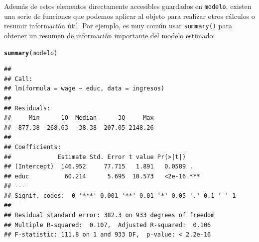 \documentclass[12pt]{report}\usepackage[]{graphicx}\usepackage[]{color}
\makeatletter
\newcommand{\hlstd}[1]{\textcolor[rgb]{0.345,0.345,0.345}{#1}}%
\newcommand{\hlkwd}[1]{\textcolor[rgb]{0.737,0.353,0.396}{\textbf{#1}}}%
\newenvironment{kframe}{%
 \def\at@end@of@kframe{}%
 \ifinner\ifhmode%
  \def\at@end@of@kframe{\end{minipage}}%
  \begin{minipage}{\columnwidth}%
 \fi\fi%
 \def\FrameCommand##1{\hskip\@totalleftmargin \hskip-\fboxsep
 \colorbox{shadecolor}{##1}\hskip-\fboxsep
     \hskip-\linewidth \hskip-\@totalleftmargin \hskip\columnwidth}%
 \MakeFramed {\advance\hsize-\width
   \@totalleftmargin\z@ \linewidth\hsize
   \@setminipage}}%
 {\par\unskip\endMakeFramed%
 \at@end@of@kframe}
\newenvironment{knitrout}{}{} %
\makeatother
\begin{document}
Además de estos elementos directamente accesibles guardados en \verb|modelo|, existen una serie de funciones que podemos aplicar al objeto para realizar otros cálculos o resumir información útil. Por ejemplo, es muy común usar \verb|summary()| para obtener un resumen de información importante del modelo estimado:
\begin{knitrout}
\color{fgcolor}\begin{kframe}
\begin{alltt}
\hlkwd{summary}\hlstd{(modelo)}
\end{alltt}
\begin{verbatim}
## 
## Call:
## lm(formula = wage ~ educ, data = ingresos)
## 
## Residuals:
##     Min      1Q  Median      3Q     Max 
## -877.38 -268.63  -38.38  207.05 2148.26 
## 
## Coefficients:
##             Estimate Std. Error t value Pr(>|t|)    
## (Intercept)  146.952     77.715   1.891   0.0589 .  
## educ          60.214      5.695  10.573   <2e-16 ***
## ---
## Signif. codes:  0 '***' 0.001 '**' 0.01 '*' 0.05 '.' 0.1 ' ' 1
## 
## Residual standard error: 382.3 on 933 degrees of freedom
## Multiple R-squared:  0.107,	Adjusted R-squared:  0.106 
## F-statistic: 111.8 on 1 and 933 DF,  p-value: < 2.2e-16
\end{verbatim}
\end{kframe}
\end{knitrout}

 
\nocite{*}
\printbibliography
\printindex
\end{document}
